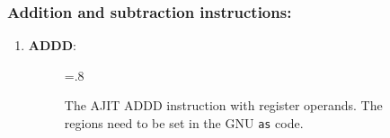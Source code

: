 \subsubsection{Addition and subtraction instructions:}
\label{sec:add:sub:insn:impl}
\begin{enumerate}
\item \textbf{ADDD}:\\
  \begin{center}
    \begin{figure}[h]
      \centering
      \epsfxsize=.8\linewidth
      \caption{The AJIT ADDD instruction  with register operands.  The
        {}  regions need  to be set  in the
        GNU \texttt{as} code.  %
      }
      \label{fig:ajit:addd:insn}
    \end{figure}
  \end{center}


\end{enumerate}
